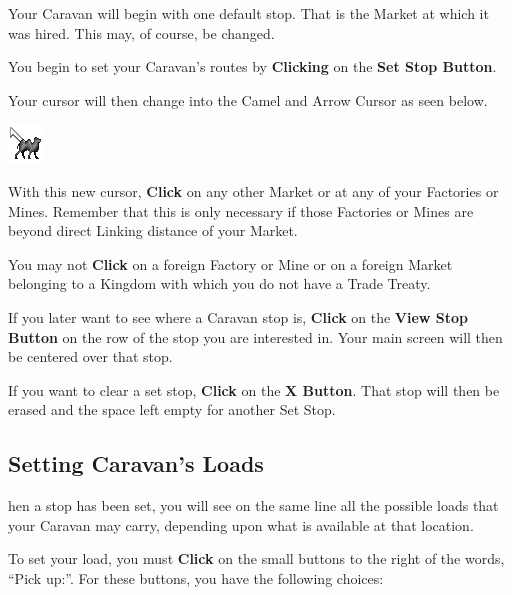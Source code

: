 Your Caravan will begin with one default stop. That is the Market at which it was hired. This may, of course, be changed.

You begin to set your Caravan’s routes by \textbf{Clicking} on the \textbf{Set Stop Button}.


Your cursor will then change into the Camel and Arrow Cursor as seen below.

\includegraphics[width=0.2\linewidth]{Bcamel}

With this new cursor, \textbf{Click} on any other Market or at any of your Factories or Mines. Remember that this is only necessary if those Factories or Mines are beyond direct Linking distance of your Market.

You may not \textbf{Click} on a foreign Factory or Mine or on a foreign Market belonging to a Kingdom with which you do not have a Trade Treaty.


If you later want to see where a Caravan stop is, \textbf{Click} on the \textbf{View Stop Button} on the row of the stop you are interested in. Your main screen will then be centered over that stop.

If you want to clear a set stop, \textbf{Click} on the \textbf{X Button}. That stop will then be erased and the space left empty for another Set Stop.

\subsection{\textsf{Setting Caravan’s Loads}}


hen a stop has been set, you will see on the same line all the possible loads that your Caravan may carry, depending upon what is available at that location.


To set your load, you must \textbf{Click} on the small buttons to the right of the words, “Pick up:”. For these buttons, you have the following choices:

